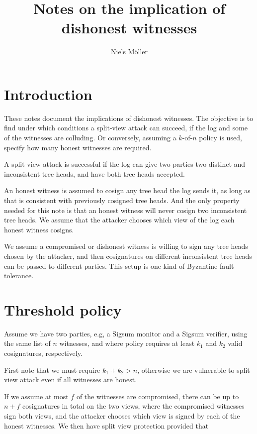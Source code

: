 \documentclass[a4paper]{article}
\author{Niels Möller}
\title{Notes on the implication of dishonest witnesses}
\begin{document}
\maketitle

\section{Introduction}

These notes document the implications of dishonest witnesses. The
objective is to find under which conditions a split-view attack can
succeed, if the log and some of the witnesses are colluding. Or
conversely, assuming a $k$-of-$n$ policy is used, specify how many
honest witnesses are required.

A split-view attack is successful if the log can give two parties two
distinct and inconsistent tree heads, and have both tree heads
accepted.

An honest witness is assumed to cosign any tree head the log sends it,
as long as that is consistent with previously cosigned tree heads. And
the only property needed for this note is that an honest witness will
never cosign two inconsistent tree heads. We assume that the attacker
chooses which view of the log each honest witness cosigns.

We assume a compromised or dishonest witness is willing to sign any
tree heads chosen by the attacker, and then cosignatures on different
inconsistent tree heads can be passed to different parties. This setup
is one kind of Byzantine fault tolerance.

\section{Threshold policy}

Assume we have two parties, e.g, a Sigsum monitor and a Sigsum
verifier, using the same list of $n$ witnesses, and where policy
requires at least $k_1$ and $k_2$ valid cosignatures, respectively.

First note that we must require $k_1 + k_2 > n$, otherwise we are
vulnerable to split view attack even if all witnesses are honest.

If we assume at most $f$ of the witnesses are compromised, there can
be up to $n + f$ cosignatures in total on the two views, where the
compromised witnesses sign both views, and the attacker chooses which
view is signed by each of the honest witnesses. We then have split
view protection provided that
\end{document}
